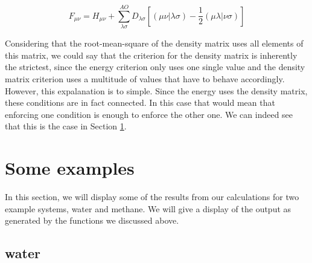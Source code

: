 \begin{equation} \label{eq: fock-matrix}
     F_{\mu\nu} = H_{\mu\nu} + \sum^{AO}_{\lambda\sigma}D_{\lambda\sigma}[(\mu\nu|\lambda\sigma) - \frac{1}{2}(\mu\lambda|\nu\sigma)]
 \end{equation}

Considering that the root-mean-square of the density matrix uses all elements of 
this matrix, we could say that the criterion for the density matrix is inherently
the strictest, since the energy criterion only uses one single value and the 
density matrix criterion uses a multitude of values that have to behave 
accordingly. However, this expalanation is to simple. Since the energy uses 
the density matrix, these conditions are in fact connected. In this case that 
would mean that enforcing one condition is enough to enforce the other one. 
We can indeed see that this is the case in Section \ref{sec: examples}. 

 
 \section{Some examples}
 \label{sec: examples}
 In this section, we will display some of the results from our calculations for 
 two example systems, water and methane. We will give a display of the output as 
 generated by the functions we discussed above.
 
 \subsection{water}
 \label{subsec:water}

